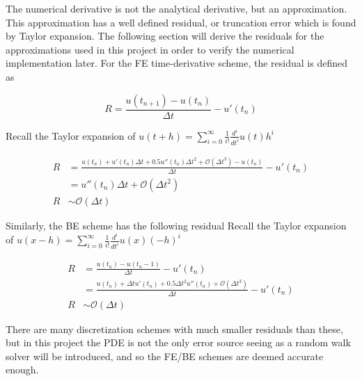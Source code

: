 The numerical derivative is not the analytical derivative, but an approximation. 
This approximation has a well defined residual, or truncation error which is found by Taylor expansion. 
The following section will derive the residuals for the approximations used in this project in order to verify the numerical implementation later. 
For the FE time-derivative scheme, the residual is defined as

\begin{equation*}
  R = \frac{u(t_{n+1}) -u(t_n)}{\Delta t} -u'(t_n)
\end{equation*}

Recall the Taylor expansion of $u(t+h) = \sum\limits_{i=0}^\infty\frac{1}{i!}\frac{d^i}{dt^i}u(t)h^i$

\begin{align*}
 R &= \frac{u(t_n)+u'(t_n)\Delta t +0.5u''(t_n)\Delta t^2 + \mathcal{O}(\Delta t^3)-u(t_n)}{\Delta t} -u'(t_n)\\
  &= u''(t_n)\Delta t+ \mathcal{O}(\Delta t^2) \\
  R &\sim \mathcal{O}(\Delta t)
\end{align*}

Similarly, the BE scheme has the following residual
Recall the Taylor expansion of $u(x-h) = \sum\limits_{i=0}^\infty\frac{1}{i!}\frac{d^i}{dt^i}u(x)(-h)^i$

\begin{align*}
  R &= \frac{u(t_{n}) -u(t_n-1)}{\Delta t} -u'(t_n) \\
  &= \frac{u(t_{n}) + \Delta t u'(t_n) + 0.5\Delta t^2 u''(t_n) +\mathcal{O}(\Delta t^3)}{\Delta t}-u'(t_n)\\
  R&\sim \mathcal{O}(\Delta t)
\end{align*}

There are many discretization schemes with much smaller residuals than these, but in this project the PDE is not the only error source seeing as a random walk solver will be introduced, and so the FE/BE schemes are deemed accurate enough.

